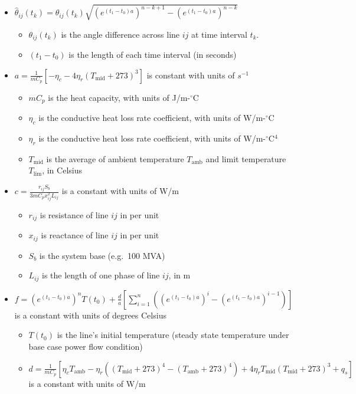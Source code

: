 \documentclass[conference]{IEEEtran}
\begin{document}
\begin{itemize}
\itemsep1pt\parskip0pt
\item
  $\hat{\theta}_{ij}(t_{k})=  \theta_{ij}(t_k)\sqrt{ (e^{(t_1-t_0)a})^{n-k+1} - (e^{(t_1-t_0)a})^{n-k} } $

  \begin{itemize}
  \itemsep1pt\parskip0pt
  \item
    $\theta_{ij}(t_k)$ is the angle difference across line $ij$ at time
    interval $t_k$.
  \item
    $(t_1-t_0)$ is the length of each time interval (in seconds)
  \end{itemize}
\item
  $ a =
  \frac{1}{mC_p}\left[ -\eta_c - 4\eta_r(T_\text{mid} + 273)^3 \right]$
  is constant with units of $s^{-1}$

  \begin{itemize}
  \itemsep1pt\parskip0pt
  \item
    $mC_p$ is the heat capacity, with units of J/m-$^\circ$C
  \item
    $\eta_c$ is the conductive heat loss rate coefficient, with units of
    W/m-$^\circ$C
  \item
    $\eta_r$ is the conductive heat loss rate coefficient, with units of
    W/m-$^\circ$C$^4$
  \item
    $T_\text{mid}$ is the average of ambient temperature $T_\text{amb}$
    and limit temperature $T_\text{lim}$, in Celsius
  \end{itemize}
\item
  $c = \frac{r_{ij}S_b}{3 mC_p x_{ij}^2L_{ij}}$ is a constant with units
  of W/m

  \begin{itemize}
  \itemsep1pt\parskip0pt
  \item
    $r_{ij}$ is resistance of line $ij$ in per unit
  \item
    $x_{ij}$ is reactance of line $ij$ in per unit
  \item
    $S_b$ is the system base (e.g.~100 MVA)
  \item
    $L_{ij}$ is the length of one phase of line $ij$, in m
  \end{itemize}
\item
  $f = (e^{(t_1 - t_0)a})^n T(t_0) + \frac{d}{a}\left[ \sum_{i=1}^n \left( (e^{(t_1-t_0)a})^i - (e^{(t_1-t_0)a})^{i-1} \right)\right]$
  is a constant with units of degrees Celsius

  \begin{itemize}
  \itemsep1pt\parskip0pt
  \item
    $T(t_0)$ is the line's initial temperature (steady state temperature
    under base case power flow condition)
  \item
    $d = \frac{1}{mC_p}\left[ \eta_cT_\text{amb} - \eta_r\left((T_\text{mid} + 273)^4 - (T_\text{amb} + 273)^4\right) + 4\eta_rT_\text{mid}(T_\text{mid} + 273)^3 + q_s \right]$
    is a constant with units of W/m


\end{itemize}
\end{itemize}
\end{document}
